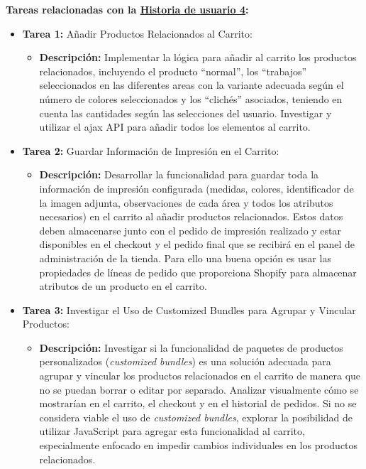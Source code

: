 \documentclass[11pt]{article}
\begin{document}
\textbf{Tareas relacionadas con la \hyperref[sec:historia4]{Historia de usuario 4}:}
\begin{itemize}
    \item \textbf{Tarea 1:} Añadir Productos Relacionados al Carrito:
          \begin{itemize}[label=--]
              \item \textbf{Descripción:} Implementar la lógica para añadir al carrito los productos relacionados, incluyendo el producto ``normal'', los ``trabajos'' seleccionados en las diferentes areas con la variante adecuada según el número de colores seleccionados y los ``clichés'' asociados, teniendo en cuenta las cantidades según las selecciones del usuario. Investigar y utilizar el ajax API para añadir todos los elementos al carrito.
          \end{itemize}
    \item \textbf{Tarea 2:} Guardar Información de Impresión en el Carrito:
          \begin{itemize}[label=--]
              \item \textbf{Descripción:} Desarrollar la funcionalidad para guardar toda la información de impresión configurada (medidas, colores, identificador de la imagen adjunta, observaciones de cada área y todos los atributos necesarios) en el carrito al añadir productos relacionados. Estos datos deben almacenarse junto con el pedido de impresión realizado y estar disponibles en el checkout y el pedido final que se recibirá en el panel de administración de la tienda. Para ello una buena opción es usar las propiedades de líneas de pedido \cite{properties-lineitem} que proporciona Shopify para almacenar atributos de un producto en el carrito.
          \end{itemize}
    \item \textbf{Tarea 3:} Investigar el Uso de Customized Bundles para Agrupar y Vincular Productos:
          \begin{itemize}[label=--]
              \item \textbf{Descripción:} Investigar si la funcionalidad de paquetes de productos personalizados (\textit{customized bundles}) es una solución adecuada para agrupar y vincular los productos relacionados en el carrito de manera que no se puedan borrar o editar por separado. Analizar visualmente cómo se mostrarían en el carrito, el checkout y en el historial de pedidos. Si no se considera viable el uso de \textit{customized bundles}, explorar la posibilidad de utilizar JavaScript para agregar esta funcionalidad al carrito, especialmente enfocado en impedir cambios individuales en los productos relacionados.
          \end{itemize} 
\end{itemize}
\end{document}
